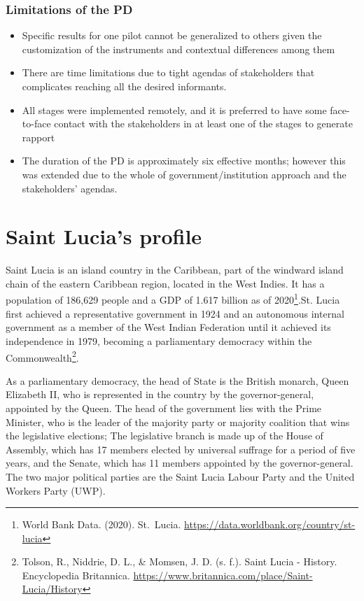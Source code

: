 \documentclass[
  10pt,
]{book}
\begin{document}
\hypertarget{limitations-of-the-pd}{%
\subsection*{Limitations of the PD}\label{limitations-of-the-pd}}

\begin{itemize}
\item
  Specific results for one pilot cannot be generalized to others given the customization of the instruments and contextual differences among them
\item
  There are time limitations due to tight agendas of stakeholders that complicates reaching all the desired informants.
\item
  All stages were implemented remotely, and it is preferred to have some face-to-face contact with the stakeholders in at least one of the stages to generate rapport
\item
  The duration of the PD is approximately six effective months; however this was extended due to the whole of government/institution approach and the stakeholders' agendas.
\end{itemize}

\hypertarget{section4}{%
\chapter{Saint Lucia's profile}\label{section4}}

Saint Lucia is an island country in the Caribbean, part of the windward island chain of the eastern Caribbean region, located in the West Indies. It has a population of 186,629 people and a GDP of 1.617 billion as of 2020\footnote{World Bank Data. (2020). St.~Lucia. \url{https://data.worldbank.org/country/st-lucia}}.St. Lucia first achieved a representative government in 1924 and an autonomous internal government as a member of the West Indian Federation until it achieved its independence in 1979, becoming a parliamentary democracy within the Commonwealth\footnote{Tolson, R., Niddrie, D. L., \& Momsen, J. D. (s. f.). Saint Lucia - History. Encyclopedia Britannica. \url{https://www.britannica.com/place/Saint-Lucia/History}}.

As a parliamentary democracy, the head of State is the British monarch, Queen Elizabeth II, who is represented in the country by the governor-general, appointed by the Queen. The head of the government lies with the Prime Minister, who is the leader of the majority party or majority coalition that wins the legislative elections; The legislative branch is made up of the House of Assembly, which has 17 members elected by universal suffrage for a period of five years, and the Senate, which has 11 members appointed by the governor-general. The two major political parties are the Saint Lucia Labour Party and the United Workers Party (UWP).
\end{document}

